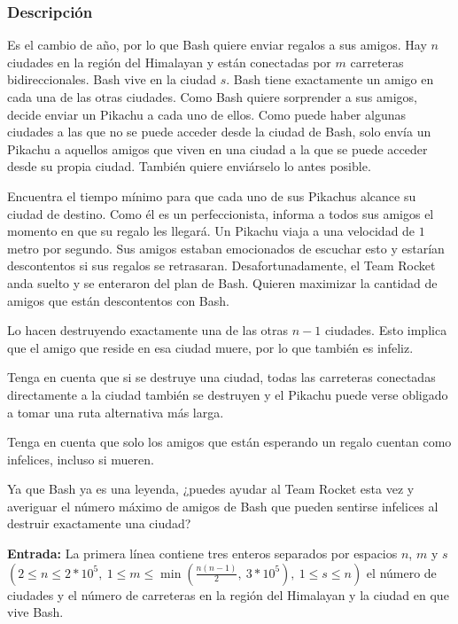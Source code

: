 \documentclass[12pt]{article}
\newcommand{\nl}{\vspace{0.3cm}}
\begin{document}
\subsubsection{Descripción}

Es el cambio de año, por lo que Bash quiere enviar regalos a sus amigos. Hay $n$ ciudades en la región del Himalayan y están conectadas por $m$ carreteras bidireccionales. Bash vive en la ciudad $s$. Bash tiene exactamente un amigo en cada una de las otras ciudades. Como Bash quiere sorprender a sus amigos, decide enviar un Pikachu a cada uno de ellos. Como puede haber algunas ciudades a las que no se puede acceder desde la ciudad de Bash, solo envía un Pikachu a aquellos amigos que viven en una ciudad a la que se puede acceder desde su propia ciudad. También quiere enviárselo lo antes posible.

\nl

Encuentra el tiempo mínimo para que cada uno de sus Pikachus alcance su ciudad de destino. Como él es un perfeccionista, informa a todos sus amigos el momento en que su regalo les llegará. Un Pikachu viaja a una velocidad de $1$ metro por segundo. Sus amigos estaban emocionados de escuchar esto y estarían descontentos si sus regalos se retrasaran. Desafortunadamente, el Team Rocket anda suelto y se enteraron del plan de Bash. Quieren maximizar la cantidad de amigos que están descontentos con Bash.

\nl

Lo hacen destruyendo exactamente una de las otras $n - 1$ ciudades. Esto implica que el amigo que reside en esa ciudad muere, por lo que también es infeliz.

\nl

Tenga en cuenta que si se destruye una ciudad, todas las carreteras conectadas directamente a la ciudad también se destruyen y el Pikachu puede verse obligado a tomar una ruta alternativa más larga.

\nl

Tenga en cuenta que solo los amigos que están esperando un regalo cuentan como infelices, incluso si mueren.

\nl

Ya que Bash ya es una leyenda, ¿puedes ayudar al Team Rocket esta vez y averiguar el número máximo de amigos de Bash que pueden sentirse infelices al destruir exactamente una ciudad?

\nl

\textbf{Entrada:} La primera línea contiene tres enteros separados por espacios $n$, $m$ y $s$ $ \left( 2 \leqslant n \leqslant 2 * 10^5,\ 1 \leqslant m \leqslant \min\left( \frac{n(n-1)}{2},\ 3 * 10^5 \right),\ 1 \leqslant s \leqslant n \right) $ el número de ciudades y el número de carreteras en la región del Himalayan y la ciudad en que vive Bash.
\end{document}
